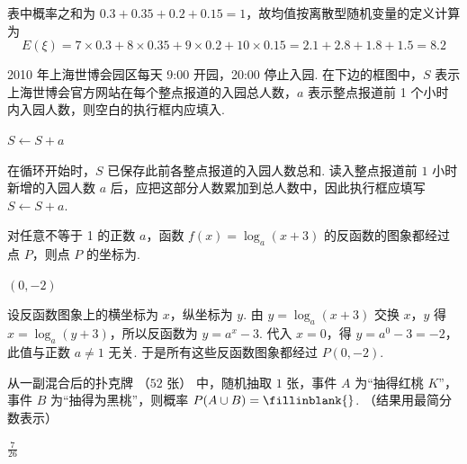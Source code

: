 \begin{solution}
表中概率之和为 \(0.3+0.35+0.2+0.15=1\)，故均值按离散型随机变量的定义计算为
\[
E(\xi)=7\times0.3+8\times0.35+9\times0.2+10\times0.15
=2.1+2.8+1.8+1.5=8.2
\]
\end{solution}

\begin{problem}
2010 年上海世博会园区每天 9:00 开园，20:00 停止入园. 在下边的框图中，\(S\) 表示上海世博会官方网站在每个整点报道的入园总人数，\(a\) 表示整点报道前 1 个小时内入园人数，则空白的执行框内应填入\fillinblank{}.

\end{problem}

\begin{answer}
\(S\leftarrow S+a\)
\end{answer}

\begin{solution}
在循环开始时，\(S\) 已保存此前各整点报道的入园人数总和. 读入整点报道前 \(1\) 小时新增的入园人数 \(a\) 后，应把这部分人数累加到总人数中，因此执行框应填写 \(S\leftarrow S+a\).
\end{solution}

\begin{problem}
对任意不等于 1 的正数 \(a\)，函数 \(f(x)=\log_{a}(x+3)\) 的反函数的图象都经过点 \(P\)，则点 \(P\) 的坐标为\fillinblank{}.
\end{problem}

\begin{answer}
\((0,-2)\)
\end{answer}

\begin{solution}
设反函数图象上的横坐标为 \(x\)，纵坐标为 \(y\). 由 \(y=\log_a(x+3)\) 交换 \(x\)，\(y\) 得 \(x=\log_a(y+3)\)，所以反函数为 \(y=a^x-3\). 代入 \(x=0\)，得 \(y=a^0-3=-2\)，此值与正数 \(a\neq1\) 无关. 于是所有这些反函数图象都经过 \(P(0,-2)\).
\end{solution}

\begin{problem}
从一副混合后的扑克牌 （\(52\text{ 张}\)） 中，随机抽取 \(1\) 张，事件 \(A\) 为“抽得红桃 \(K\)”，事件 \(B\) 为“抽得为黑桃”，则概率 \(P(A \cup B) =\fillinblank{}\). （结果用最简分数表示）
\end{problem}

\begin{answer}
\(\frac{7}{26}\)
\end{answer}


